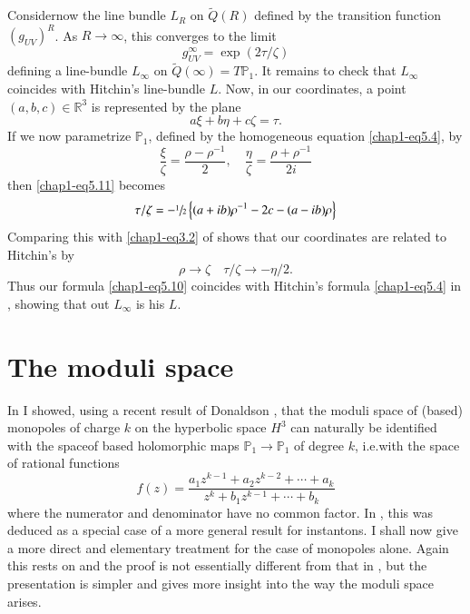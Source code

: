 Consider\pageoriginale now the line bundle $L_{R}$ on
$\widetilde{Q}(R)$ defined by the transition function
$(g_{UV})^{R}$. As $R\to \infty$, this converges to the limit
\begin{equation}
g^{\infty}_{UV}=\exp (2\tau/\zeta)\label{chap1-eq5.10}
\end{equation}
defining a line-bundle $L_{\infty}$ on
$\widetilde{Q}(\infty)=T\mathbb{P}_{1}$. It remains to check that
$L_{\infty}$ coincides with Hitchin's line-bundle $L$. Now, in our
coordinates, a point $(a,b,c)\in \mathbb{R}^{3}$ is represented by the
plane 
\begin{equation}
a\xi+b\eta+c\zeta=\tau.\label{chap1-eq5.11}
\end{equation}
If we now parametrize $\mathbb{P}_{1}$, defined by the homogeneous
equation \eqref{chap1-eq5.4}, by
$$
\frac{\xi}{\zeta}=\dfrac{\rho-\rho^{-1}}{2},\quad \frac{\eta}{\zeta}=\dfrac{\rho+\rho^{-1}}{2i}
$$
then \eqref{chap1-eq5.11} becomes
\begin{equation}
\tau/\zeta=-\sfrac{1}{2}\left\{(a+ib)\rho^{-1}-2c-(a-ib)\rho\right\}\label{chap1-eq5.12} 
\end{equation}
Comparing this with \eqref{chap1-eq3.2} of \cite{chap1-key1} shows
that our coordinates are related to Hitchin's by
$$
\rho\to \zeta\quad \tau/\zeta\to -\eta/2.
$$
Thus our formula \eqref{chap1-eq5.10} coincides with Hitchin's formula
\eqref{chap1-eq5.4} in \cite{chap1-key7}, showing that out
$L_{\infty}$ is his $L$.

\section{The moduli space}\label{chap1-sec6}

In \cite{chap1-key2} I showed, using a recent result of Donaldson
\cite{chap1-key4}, that the moduli space of (based) monopoles of
charge $k$ on the hyperbolic space $H^{3}$ can naturally be identified
with the space\pageoriginale of based holomorphic maps
$\mathbb{P}_{1}\to \mathbb{P}_{1}$ of degree $k$, i.e.\@ with the
space of rational functions
$$
f(z)=\dfrac{a_{1}z^{k-1}+a_{2}z^{k-2}+\cdots+a_{k}}{z^{k}+b_{1}z^{k-1}+\cdots+b_{k}} 
$$
where the numerator and denominator have no common factor. In
\cite{chap1-key2}, this was deduced as a special case of a more
general result for instantons. I shall now give a more direct and
elementary treatment for the case of monopoles alone. Again this rests
on \cite{chap1-key4} and the proof is not essentially different from
that in \cite{chap1-key2}, but the presentation is simpler and gives
more insight into the way the moduli space arises.

